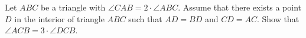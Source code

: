 Let $ABC$ be a triangle with $\angle CAB=2\cdot \angle ABC$.
Assume that there exists a point $D$ in the interior of triangle $ABC$ such that $AD = BD$ and $CD = AC$.
Show that $\angle ACB=3\cdot \angle DCB$.
